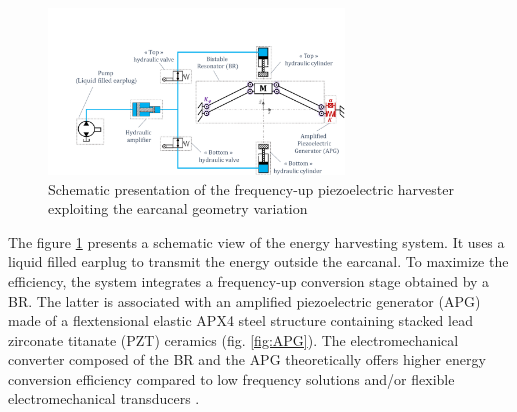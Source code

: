 \documentclass[3p,twocolumn,preprint]{elsarticle}
\begin{document}
\begin{figure}[!htbp]
	\centering
	\captionsetup{justification=centering}
	\includegraphics[trim={3.2cm 0cm 0cm 4.3cm},clip, width=0.7\textwidth]{figures/system_presentation.pdf}
	\caption{Schematic presentation of the frequency-up piezoelectric harvester exploiting the earcanal geometry variation} 
	\label{fig:system_presentation}
\end{figure}
The figure \ref{fig:system_presentation} presents a schematic view of the energy harvesting system. It uses a liquid filled earplug to transmit the energy outside the earcanal. To maximize the efficiency, the system integrates a frequency-up conversion stage obtained by a BR. The latter is associated with an amplified piezoelectric generator (APG) \cite{CEDRATTECHNOLOGIES2022} made of a flextensional elastic APX4 steel \cite{AUBERT&DUVAL2022} structure containing stacked lead zirconate titanate (PZT) ceramics (fig. \ref{fig:APG}). The electromechanical converter composed of the BR and the APG theoretically offers higher energy conversion efficiency compared to low frequency solutions and/or flexible electromechanical transducers \cite{Abdelnaby2016}.
\end{document}
